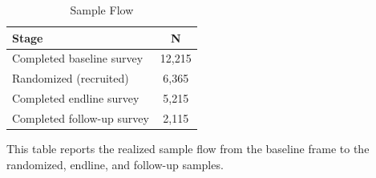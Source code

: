\begin{table}[H]
\centering
\caption{Sample Flow}
\label{tab:sample_flow}
\footnotesize
\begin{threeparttable}
\begin{tabular}{lc}
\toprule
Stage & N \\
\midrule
Completed baseline survey & 12,215 \\
Randomized (recruited) & 6,365 \\
Completed endline survey & 5,215 \\
Completed follow-up survey & 2,115 \\
\bottomrule
\end{tabular}
\begin{tablenotes}[flushleft]
\footnotesize
\item This table reports the realized sample flow from the baseline frame to the randomized, endline, and follow-up samples.
\end{tablenotes}
\end{threeparttable}
\end{table}
